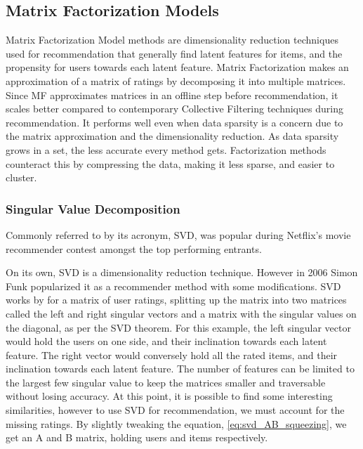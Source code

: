 \subsection{Matrix Factorization Models} \label{bg:sub:factorizationmodels}
Matrix Factorization Model methods are dimensionality reduction techniques used for recommendation that generally find latent features for items, and the propensity for users towards each latent feature.
Matrix Factorization makes an approximation of a matrix of ratings by decomposing it into multiple matrices.
Since MF approximates matrices in an offline step before recommendation, it scales better compared to contemporary Collective Filtering techniques during recommendation. It performs well even when data sparsity is a concern due to the matrix approximation and the dimensionality reduction.
As data sparsity grows in a set, the less accurate every method gets. Factorization methods counteract this by compressing the data, making it less sparse, and easier to cluster.

\subsubsection{Singular Value Decomposition}
Commonly referred to by its acronym, SVD, was popular during Netflix's movie recommender contest amongst the top performing entrants.

On its own, SVD is a dimensionality reduction technique. However in 2006 Simon Funk popularized it as a recommender method with some modifications.
SVD works by for a matrix of user ratings, splitting up the matrix into two matrices called the left and right singular vectors and a matrix with the singular values on the diagonal, as per the SVD theorem. For this example, the left singular vector would hold the users on one side, and their inclination towards each latent feature. The right vector would conversely hold all the rated items, and their inclination towards each latent feature.
The number of features can be limited to the largest few singular value to keep the matrices smaller and traversable without losing accuracy.
At this point, it is possible to find some interesting similarities, however to use SVD for recommendation, we must account for the missing ratings. By slightly tweaking the equation, \ref{eq:svd_AB_squeezing}, we get an A and B matrix, holding users and items respectively.

